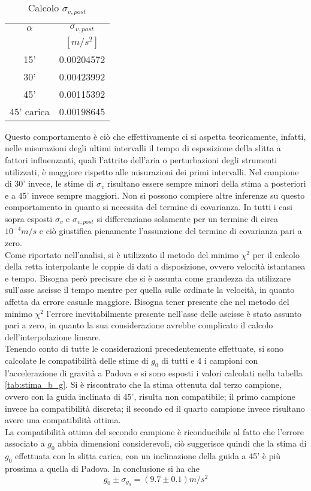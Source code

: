 \documentclass[a4paper,11pt,oneside]{article}
\begin{document}
\begin{wraptable}{l}{5cm}%
\centering
    \begin{tabular}{c|c}
        \toprule
        $\alpha$ & $\sigma_{v, post}$ \\
        & $[\si{m/s^{2}}]$\\
        \midrule
        15' &  0.00204572\\
        30' & 0.00423992 \\
        45' & 0.00115392 \\
        45' carica & 0.00198645 \\
        \bottomrule
    \end{tabular}
    \caption{Calcolo $\sigma_{v, post}$}
    \label{tab:v_post}
\end{wraptable}
Questo comportamento è ciò che effettivamente ci si aspetta teoricamente, infatti, nelle misurazioni degli ultimi intervalli il tempo di esposizione della slitta a fattori influenzanti, quali l'attrito dell'aria o perturbazioni degli strumenti utilizzati, è maggiore rispetto alle misurazioni dei primi intervalli. Nel campione di 30' invece, le stime di $\sigma_{v}$ risultano essere sempre minori della stima a posteriori e a 45' invece sempre maggiori. Non si possono compiere altre inferenze su questo comportamento in quanto si necessita del termine di covarianza. In tutti i casi sopra esposti $\sigma_{v}$ e $\sigma_{v, post}$ si differenziano solamente per un termine di circa $10^{-4}\si{m/s}$ e ciò giustifica pienamente l'assunzione del termine di covarianza pari a zero.\\
Come riportato nell'analisi, si è utilizzato il metodo del minimo ${\chi}^2$ per il calcolo della retta interpolante le coppie di dati a disposizione, ovvero velocità istantanea e tempo. Bisogna però precisare che si è assunta come grandezza da utilizzare sull'asse ascisse il tempo mentre per quella sulle ordinate la velocità, in quanto affetta da errore casuale maggiore. Bisogna tener presente che nel metodo del minimo ${\chi}^{2}$ l'errore inevitabilmente presente nell'asse delle ascisse è stato assunto pari a zero, in quanto la sua considerazione avrebbe complicato il calcolo dell'interpolazione lineare.\\
Tenendo conto di tutte le considerazioni precedentemente effettuate, si sono calcolate le compatibilità delle stime di $g_0$ di tutti e 4 i campioni con l'accelerazione di gravità a Padova e si sono esposti i valori calcolati nella tabella \ref{tab:stima_b_g}. Si è riscontrato che la stima ottenuta dal terzo campione, ovvero con la guida inclinata di 45', risulta non compatibile; il primo campione invece ha compatibilità discreta; il secondo ed il quarto campione invece risultano avere una compatibilità ottima.\\
La compatibilità ottima del secondo campione è riconducibile al fatto che l'errore associato a $g_0$ abbia dimensioni considerevoli, ciò suggerisce quindi che la stima di $g_0$ effettuata con la slitta carica, con un inclinazione della guida a 45' è più prossima a quella di Padova. In conclusione si ha che
\begin{equation*}
    g_0\pm\sigma_{g_0}= \left(9.7\pm0.1 \right) \si{m/s^{2}}
\end{equation*}
\end{document}

